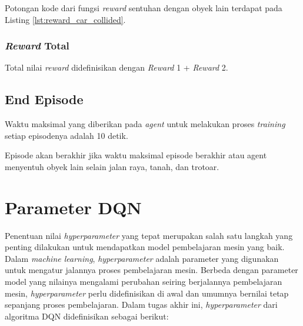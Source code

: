 Potongan kode dari fungsi \textit{reward} sentuhan dengan obyek lain terdapat pada Listing \ref{lst:reward_car_collided}.

\subsubsection{\textit{Reward }Total}
Total nilai \textit{reward} didefinisikan dengan \textit{Reward} 1 + \textit{Reward} 2.

\subsection{End Episode}
\label{sec:end_episode}
Waktu maksimal yang diberikan pada \textit{agent} untuk melakukan proses \textit{training} setiap episodenya adalah 10 detik.

Episode akan berakhir jika waktu maksimal episode berakhir atau agent menyentuh obyek lain selain jalan raya, tanah, dan trotoar.

\section{Parameter DQN}
\label{sec:parameter_dqn}
Penentuan nilai \textit{hyperparameter} yang tepat merupakan salah satu langkah yang penting dilakukan untuk mendapatkan model pembelajaran mesin yang baik. Dalam \textit{machine learning}, \textit{hyperparameter} adalah parameter yang digunakan untuk mengatur jalannya proses pembelajaran mesin. Berbeda dengan parameter model yang nilainya mengalami perubahan seiring berjalannya pembelajaran mesin, \textit{hyperparameter} perlu didefinisikan di awal dan umumnya bernilai tetap sepanjang proses pembelajaran. Dalam tugas akhir ini, \textit{hyperparameter} dari algoritma DQN didefinisikan sebagai berikut:

